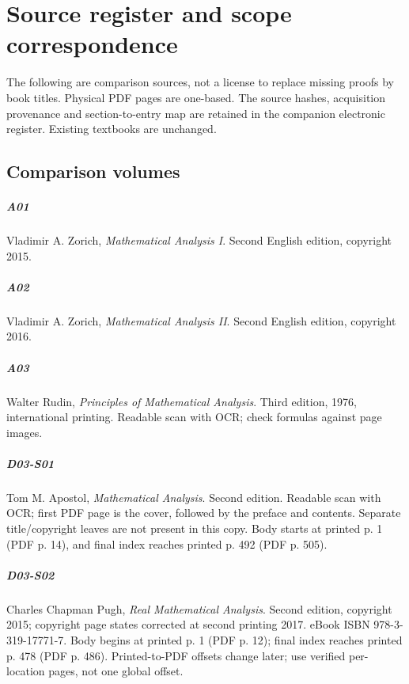 \chapter{Source register and scope correspondence}

The following are comparison sources, not a license to replace missing proofs by book titles. Physical PDF pages are one-based. The source hashes, acquisition provenance and section-to-entry map are retained in the companion electronic register. Existing textbooks are unchanged.

\section*{Comparison volumes}

\paragraph{A01} Vladimir A. Zorich, \emph{Mathematical Analysis I}. Second English edition, copyright 2015.

\paragraph{A02} Vladimir A. Zorich, \emph{Mathematical Analysis II}. Second English edition, copyright 2016.

\paragraph{A03} Walter Rudin, \emph{Principles of Mathematical Analysis}. Third edition, 1976, international printing. Readable scan with OCR; check formulas against page images.

\paragraph{D03-S01} Tom M. Apostol, \emph{Mathematical Analysis}. Second edition. Readable scan with OCR; first PDF page is the cover, followed by the preface and contents. Separate title/copyright leaves are not present in this copy. Body starts at printed p. 1 (PDF p. 14), and final index reaches printed p. 492 (PDF p. 505).

\paragraph{D03-S02} Charles Chapman Pugh, \emph{Real Mathematical Analysis}. Second edition, copyright 2015; copyright page states corrected at second printing 2017. eBook ISBN 978-3-319-17771-7. Body begins at printed p. 1 (PDF p. 12); final index reaches printed p. 478 (PDF p. 486). Printed-to-PDF offsets change later; use verified per-location pages, not one global offset.

